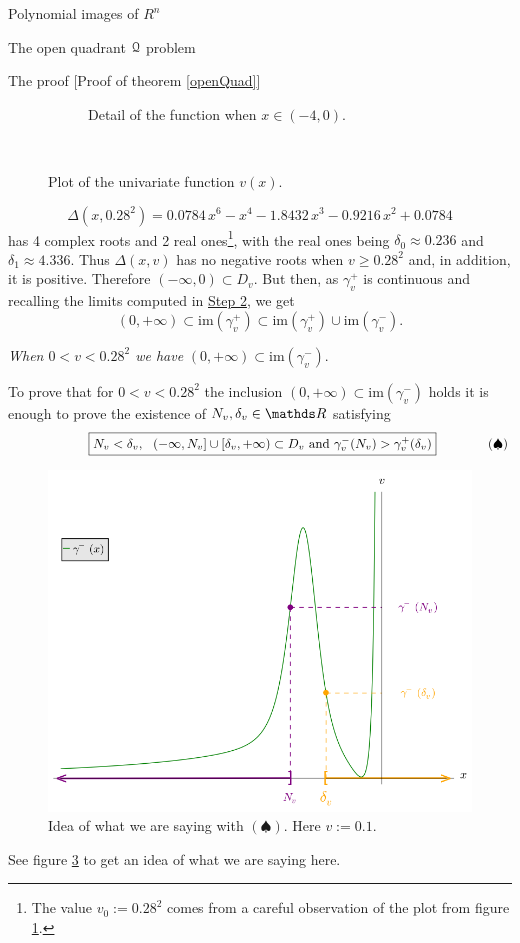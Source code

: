 \documentclass[11pt, a4paper, english, twoside, notitlepage, openright]{report}
\begin{document}
\begin{chapter}{Polynomial images of $R^n$}
\begin{section}{The open quadrant $\mathcal{Q}$ problem}
\begin{subsection}{The proof} [Proof of theorem \ref{openQuad}]
\begin{figure}[h]
\begin{subfigure}{.6\linewidth}
\caption{Detail of the function when $x\in(-4,0)$.\label{fig:uveDetail}}
\end{subfigure}\\[1ex]
\caption{Plot of the univariate function $v(x)$.\label{fig:v(x)}}
\end{figure}
$$
\Delta(x,0.28^2)=0.0784\,x^{6}-x^{4}-1.8432\,x^{3}-0.9216\,x^{2}+0.0784
$$ 
has 4 complex roots and 2 real ones\footnote{The value $v_0:=0.28^2$ comes from a careful observation of the plot from figure \ref{fig:uveDetail}.}, with the real ones being $\delta_0\approx 0.236$ and $\delta_1\approx 4.336$. Thus $\Delta(x,v)$ has no negative roots when $v\ge 0.28^2$ and, in addition, it is positive. Therefore $(-\infty,0)\subset D_v$. But then, as $\gamma_v^+$ is continuous and recalling the limits computed in \hyperref[step2]{Step 2}, we get  
$$
(0,+\infty)\subset\text{im}(\gamma_v^+)\subset\text{im}(\gamma_v^+)\cup\text{im}(\gamma_v^-).
$$
\begin{center}
 \emph{When $0<v<0.28^2$ we have} $(0,+\infty)\subset\text{im}(\gamma_v^-)$.
\end{center}
\label{step4}
To prove that for $0<v<0.28^2$ the inclusion $(0,+\infty)\subset\text{im}(\gamma_v^-)$ holds it is enough to prove the existence of $N_v,\delta_v\in\R$ satisfying			
\begin{equation*}\qquad \quad
\qquad\quad\boxed{N_v<\delta_v,\ \ (-\infty,N_v]\cup[\delta_v,+\infty)\subset D_v\text{ and } \gamma_v^-(N_v)>\gamma_v^+(\delta_v)\\
}\qquad \qquad (\spadesuit)
\end{equation*}
\begin{figure}[h]
\centering
\includegraphics[width=1\textwidth]{plots/ch1_12_idea.png}
\caption{Idea of what we are saying with $(\spadesuit)$. Here $v:=0.1$.\label{fig:idea}}
\end{figure}
See figure \ref{fig:idea} to get an idea of what we are saying here. 


\end{subsection}
\end{section}
\end{chapter}
\end{document}
